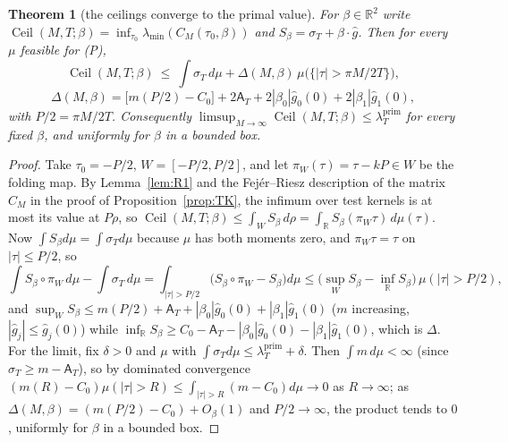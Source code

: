\documentclass[11pt]{amsart}
\newtheorem{theorem}{Theorem}[section]
\theoremstyle{definition}
\theoremstyle{remark}
\newcommand{\R}{\mathbb R}
\newcommand{\lamP}{\lambda^{\mathrm{prim}}_T}
\newcommand{\sT}{\sigma_T}
\newcommand{\gh}[1]{\widehat g_{#1}}
\newcommand{\Aconst}{\mathsf A_T}
\begin{document}
\begin{theorem}[the ceilings converge to the primal value]\label{thm:R}
For $\beta\in\R^2$ write $\operatorname{Ceil}(M,T;\beta)=\inf_{\tau_0}\lambda_{\min}(C_M(\tau_0,\beta))$
and $S_\beta=\sT+\beta\cdot\widehat g$. Then for every $\mu$ feasible for \textup{(P)},
\[
\operatorname{Ceil}(M,T;\beta)\ \le\ \int\sT\,d\mu+\Delta(M,\beta)\,\mu\big(\{|\tau|>\pi M/2T\}\big),
\]
\[
\Delta(M,\beta)=\big[m(P/2)-C_0\big]+2\Aconst+2|\beta_0|\gh0(0)+2|\beta_1|\gh1(0),
\]
with $P/2=\pi M/2T$. Consequently $\limsup_{M\to\infty}\operatorname{Ceil}(M,T;\beta)\le\lamP$ for
every fixed $\beta$, and uniformly for $\beta$ in a bounded box.
\end{theorem}
\begin{proof}
Take $\tau_0=-P/2$, $W=[-P/2,P/2]$, and let $\pi_W(\tau)=\tau-kP\in W$ be the folding map. By
Lemma~\ref{lem:R1} and the Fej\'er--Riesz description of the matrix $C_M$ in the proof of
Proposition~\ref{prop:TK}, the infimum over test kernels is at most its value at $P\rho$, so
$\operatorname{Ceil}(M,T;\beta)\le\int_WS_\beta\,d\rho=\int_\R S_\beta(\pi_W\tau)\,d\mu(\tau)$. Now
$\int S_\beta d\mu=\int\sT d\mu$ because $\mu$ has both moments zero, and $\pi_W\tau=\tau$ on
$|\tau|\le P/2$, so
\[
\int S_\beta\circ\pi_W\,d\mu-\int\sT\,d\mu=\int_{|\tau|>P/2}\big(S_\beta\circ\pi_W-S_\beta\big)d\mu
\le\big(\sup_WS_\beta-\inf_\R S_\beta\big)\,\mu(|\tau|>P/2),
\]
and $\sup_WS_\beta\le m(P/2)+\Aconst+|\beta_0|\gh0(0)+|\beta_1|\gh1(0)$ ($m$ increasing,
$|\gh j|\le\gh j(0)$) while $\inf_\R S_\beta\ge C_0-\Aconst-|\beta_0|\gh0(0)-|\beta_1|\gh1(0)$, which
is $\Delta$. For the limit, fix $\delta>0$ and $\mu$ with $\int\sT d\mu\le\lamP+\delta$. Then
$\int m\,d\mu<\infty$ (since $\sT\ge m-\Aconst$), so by dominated convergence
$(m(R)-C_0)\mu(|\tau|>R)\le\int_{|\tau|>R}(m-C_0)d\mu\to0$ as $R\to\infty$; as
$\Delta(M,\beta)=(m(P/2)-C_0)+O_\beta(1)$ and $P/2\to\infty$, the product tends to $0$, uniformly for
$\beta$ in a bounded box.
\end{proof}
\end{document}
